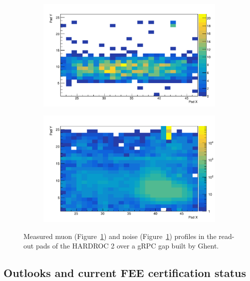 	\begin{figure}[H]
		\begin{subfigure}{.5\linewidth}
		    \centering
			\includegraphics[width = \linewidth]{fig/chapt6/Muon-Profile-gRPC-HARDROC.pdf}
			\caption{\label{fig:HARDROC2-gRPC-profiles:A}}
		\end{subfigure}
		\begin{subfigure}{.5\linewidth}
		    \centering
			\includegraphics[width = \linewidth]{fig/chapt6/Noise-Profile-gRPC-HARDROC.pdf}
			\caption{\label{fig:HARDROC2-gRPC-profiles:B}}
		\end{subfigure}
		\caption{\label{fig:HARDROC2-gRPC-profiles} Measured muon (Figure~\ref{fig:HARDROC2-gRPC-profiles:A}) and noise (Figure~\ref{fig:HARDROC2-gRPC-profiles:A}) profiles in the read-out pads of the HARDROC 2 over a gRPC gap built by Ghent.}
    \end{figure}
    
	\subsection{Outlooks and current FEE certification status}
	\label{chapt6:ssec:outlooks}

\clearpage{\pagestyle{empty}\cleardoublepage}